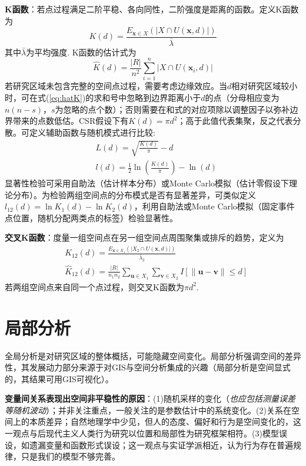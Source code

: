 \par \textbf{K函数}：若点过程满足二阶平稳、各向同性，二阶强度是距离的函数。定义K函数为
\begin{equation}
    K(d)=\frac{E_{\mathbf{x}\in X}(\vert X\cap U(\mathbf{x},d)\vert )}{\bar{\lambda}}
\end{equation}
其中$\bar{\lambda}$为平均强度. K函数的估计式为
\begin{equation}
    \hat{K}(d)=\frac{\vert R \vert}{n^2}\sum_{i=1}^n \vert X\cap U(\mathbf{x}_i,d)\vert
    \label{eq:hatK}
\end{equation}
若研究区域未包含完整的空间点过程，需要考虑边缘效应。当$d$相对研究区域较小时，可在式(\ref{eq:hatK})的求和号中忽略到边界距离小于$d$的点（分母相应变为$n(n-s)$，$s$为忽略的点个数）；否则需要在和式的对应项除以调整因子以弥补边界带来的点数低估。CSR假设下有$K(d)=\pi d^2$；高于此值代表集聚，反之代表分散。可定义辅助函数与随机模式进行比较:
\begin{align}
    &L(d)=\sqrt{\frac{K(d)}{\pi}}-d\\
    &l(d)=\frac{1}{2}\ln\left(\frac{K(d)}{\pi}\right)-\ln(d)
\end{align}
显著性检验可采用自助法（估计样本分布）或Monte Carlo模拟（估计零假设下理论分布）。为检验两组空间点的分布模式是否有显著差异，可类似定义$l_{12}(d)=\ln K_1(d)-\ln K_2(d)$，利用自助法或Monte Carlo模拟（固定事件点位置，随机分配两类点的标签）检验显著性。

\par \textbf{交叉K函数}：度量一组空间点在另一组空间点周围聚集或排斥的趋势，定义为
\begin{align}
    &K_{12}(d)=\frac{E_{\mathbf{x}\in X_1}(\vert X_2\cap U(\mathbf{x},d)\vert )}{\bar{\lambda}_2}\\
    &\hat{K}_{12}(d)=\frac{\vert R \vert}{n_1n_2}\sum_{\mathbf{u}\in X_1}\sum_{\mathbf{v}\in X_2} I[\|\mathbf{u}-\mathbf{v}\|\le d]
\end{align}
若两组空间点来自同一个点过程，则交叉K函数为$\pi d^2$.


\section{局部分析}

\par 全局分析是对研究区域的整体概括，可能隐藏空间变化。局部分析强调空间的差异性，其发展动力部分来源于对GIS与空间分析集成的兴趣（局部分析是空间显式的，其结果可用GIS可视化）。

\par \textbf{变量间关系表现出空间非平稳性的原因}：(1)随机采样的变化（\emph{也应包括测量误差等随机波动}）；并非关注重点，一般关注的是参数估计中的系统变化。(2)关系在空间上的本质差异；自然地理学中少见，但人的态度、偏好和行为是空间变化的，这一观点与后现代主义人类行为研究以位置和局部性为研究框架相符。(3)模型误设，如遗漏变量和函数形式误设；这一观点与实证学派相近，认为行为存在普遍规律，只是我们的模型不够完善。

